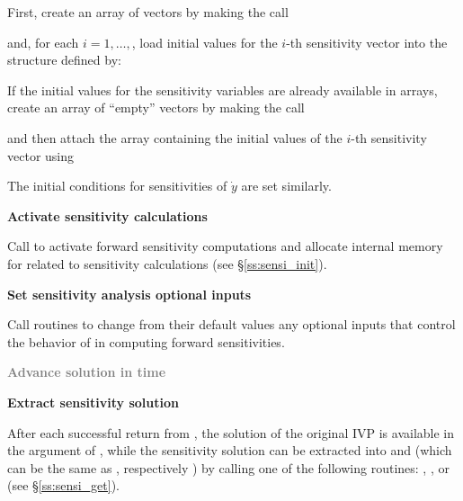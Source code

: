 \begin{Steps}
  First, create an array of  vectors by making the call

  {\s} 

  {\p} 

  and, for each $i=1,\ldots,$, load initial values for the $i$-th sensitivity 
  vector into the structure defined by:

  {\s} 

  {\p} 

  If the initial values for the sensitivity variables are already available in
   arrays, create an array of  ``empty'' vectors by making the call

  {\s} 

  {\p} 

  and then attach the  array  containing the initial values of the
  $i$-th sensitivity vector using

  {\s} 
  
  {\p} 

  The initial conditions for sensitivities  of $\dot{y}$ are set similarly.  

\item
  {\bf Activate sensitivity calculations}

  Call \id{(\ldots);} to activate forward 
  sensitivity computations and allocate internal memory for {\idas} related 
  to sensitivity calculations (see \S\ref{ss:sensi_init}).

\item
  {\bf Set sensitivity analysis optional inputs}

  Call  routines to change from their default values any
  optional inputs that control the behavior of {\idas} in computing forward 
  sensitivities.

\item
  \textcolor{gray}{\bf Advance solution in time}

\item
  {\bf Extract sensitivity solution}

  After each successful return from , the solution of the
  original IVP is available in the  argument of ,
  while the sensitivity solution can be extracted into  and 
  (which can be the same as , respectively ) by calling 
  one of the following routines: , , 
   or  (see \S\ref{ss:sensi_get}).


\end{Steps}
